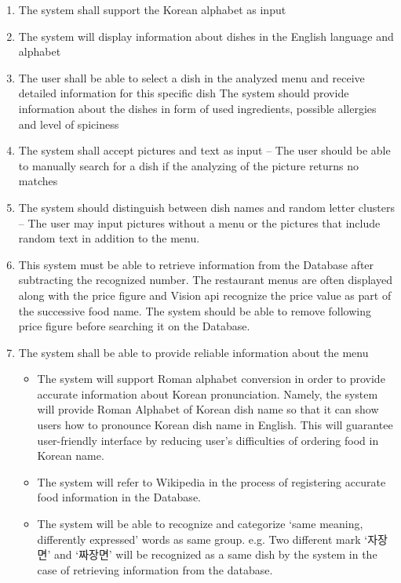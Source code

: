 \begin{enumerate}[label=A.\arabic*]
\item The system shall support the Korean alphabet as input \newline
\item The system will display information about dishes in the English language and alphabet \newline
\item The user shall be able to select a dish in the analyzed menu and receive detailed information for this specific dish
The system should provide information about the dishes in form of used ingredients, possible allergies and level of spiciness \newline
\item The system shall accept pictures and text as input – The user should be able to manually search for a dish if the analyzing of the picture returns no matches \newline
\item The system should distinguish between dish names and random letter clusters – The user may input pictures without a menu or the pictures that include random text in addition to the menu. \newline
\item This system must be able to retrieve information from the Database after subtracting the recognized number. The restaurant menus are often displayed along with the price figure and Vision api recognize the price value as part of the successive food name. The system should be able to remove following price figure before searching it on the Database. \newline
\item The system shall be able to provide reliable information about the menu \newline
    \begin{itemize}
    \item The system will support Roman alphabet conversion in order to provide accurate information about Korean pronunciation. 
Namely, the system will provide Roman Alphabet of Korean dish name so that it can show users how to pronounce Korean dish name in English. This will guarantee user-friendly interface by reducing user’s difficulties of ordering food in Korean name.\newline
    \item The system will refer to Wikipedia in the process of registering accurate food information in the Database.  \newline
    \item  The system will be able to recognize and categorize ‘same meaning, differently expressed’ words as same group. 
e.g. Two different mark ‘자장면’ and ‘짜장면’ will be recognized as a same dish by the system in the case of retrieving information from the database.

    \end{itemize}
\end{enumerate}

